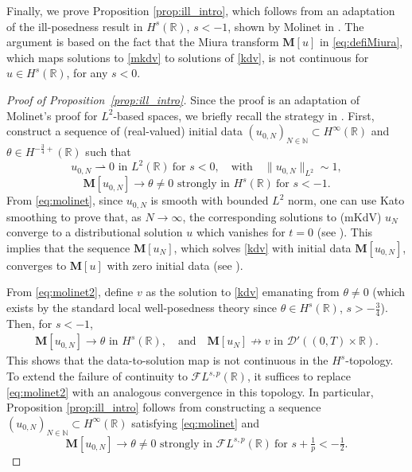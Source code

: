 \documentclass[a4paper,
11pt,  reqno]{amsart}
\newcommand{\5}{\textup{V}}
\newcommand{\FL}{\mathcal{F} L}
\theoremstyle{remark}
\newcommand{\R}{\mathbb{R}}
\newcommand{\MMb}{\mathbf{M}}
\newcommand{\N}{\mathbb{N}}
\numberwithin{equation}{section}
\numberwithin{theorem}{section}
\begin{document}
Finally, we prove Proposition \ref{prop:ill_intro}, which follows from an adaptation of the ill-posedness result in $H^s(\R)$, $s<-1$, shown by Molinet in \cite{Molinet_ill_line}. The argument is based on the fact that the Miura transform $\MMb[u]$ in \eqref{eq:defiMiura}, which
maps solutions to \eqref{mkdv} to solutions of \eqref{kdv},
is not continuous for $u\in H^s(\R)$, for any $s<0$.




\begin{proof}[Proof of Proposition~\ref{prop:ill_intro}]


Since the proof is an adaptation of Molinet's proof for $L^2$-based spaces, we briefly recall the strategy in \cite{Molinet_ill_line}.
 First, construct a sequence of (real-valued) initial data $(u_{0,N})_{N\in\N}\subset H^\infty(\R)$ and $\theta\in H^{-\frac34+}(\R)$ such that
\begin{equation}\label{eq:molinet}
	u_{0,N}\rightharpoonup 0 \mbox{ in }L^2(\R)\ \text{for } s<0,\quad \text{with}
    \quad \|u_{0,N}\|_{L^2}\sim 1,
\end{equation}
\begin{equation}\label{eq:molinet2}
 \MMb[u_{0,N}] \to \theta\neq 0  \mbox{ strongly in }H^{s}(\R)
 \ \text{for }
 s<-1.
\end{equation}
From \eqref{eq:molinet}, since $u_{0,N}$ is smooth with bounded $L^2$ norm, one can use Kato smoothing to prove that, as $N\to \infty$, the corresponding solutions to (mKdV) $u_N$ converge to a distributional solution $u$ which vanishes for $t=0$ (see \cite[Proposition 2.1]{Molinet_ill_line}). This implies that the sequence $\MMb[u_N]$, which solves \eqref{kdv} with initial data $\MMb[u_{0,N}]$, converges to $\MMb[u]$ with zero initial data (see \cite[Proposition 2.2]{Molinet_ill_line}).

From \eqref{eq:molinet2}, define $v$ as the solution to \eqref{kdv} emanating from $\theta\neq 0$ (which exists by the standard local well-posedness theory since $\theta\in H^s(\R)$, $s>-\frac34$).
Then, for $s<-1$,
\begin{align}
\MMb[u_{0, N}] \to \theta \mbox{ in }H^s(\R),
\quad
\text{and}
\quad
\MMb[u_N] \not\to v \mbox{ in  }\mathcal{D}'((0,T)\times \R).
\end{align}
This shows that the data-to-solution map is not continuous in the $H^s$-topology.
To extend the failure of continuity to $\FL^{s,p}(\R)$, it suffices to replace \eqref{eq:molinet2} with an analogous convergence in this topology.
In particular, Proposition \ref{prop:ill_intro} follows from constructing a sequence $(u_{0,N})_{N\in \N} \subset H^\infty(\R)$ satisfying \eqref{eq:molinet} and
\begin{equation}\label{eq:molinet2_v2}
 \MMb[u_{0,N}] \to \theta\neq 0 \mbox{ strongly in }\mathcal{F}L^{s,p}(\R) \ \text{for } s+\tfrac1p<-\tfrac12.
\end{equation}





\end{proof}
\end{document}
